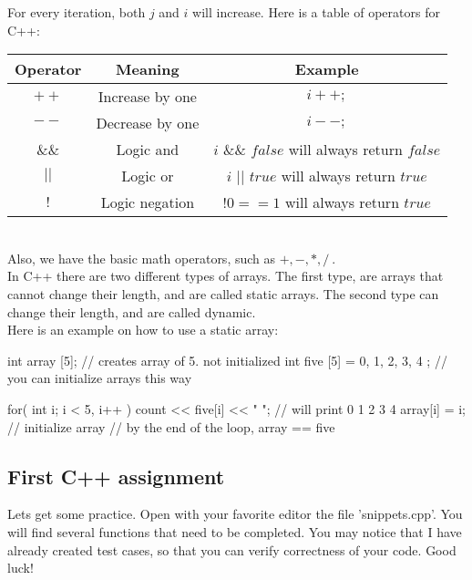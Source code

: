 \documentclass[../notebook.tex]{../subfiles/subfiles}
\begin{document}
For every iteration, both $j$ and $i$ will increase. Here is a table of operators for C++:\\
\begin{tabular}{|c | c | c |}
  \hline
  {\bf Operator} & {\bf Meaning} & {\bf Example} \\ 
  \hline
  $++$& Increase by one & $i++;$  \\
  \hline
  $--$& Decrease by one & $i--;$  \\
  \hline
  $\&\&$ & Logic and & $ i$ \&\& $false  $ will always return $false$ \\
  \hline
  $||$ & Logic or & $ i$ $||$ $true  $ will always return $true$ \\
  $!$ & Logic negation &  $!0 == 1  $ will always return $true$ \\
  \hline
\end{tabular}\\

Also, we have the basic math operators, such as $+,-,*,/\ $.\\
In C++ there are two different types of arrays. The first type, are arrays that cannot change their length, and are called static arrays. The second type can change their length, and are called dynamic.\\
Here is an example on how to use a static array:
\begin{cppcode}
  int array [5]; // creates array of 5. not initialized
  int five  [5] = { 0, 1, 2, 3, 4 }; // you can initialize arrays this way

  for( int i; i < 5, i++ )
  {
    count << five[i] << "  "; // will print 0 1 2 3 4
    array[i] = i; // initialize array
  }
  // by the end of the loop, array == five
\end{cppcode}
\subsection{First C++ assignment} %
\label{sub:First C++ assignment}
Lets get some practice. Open with your favorite editor the file 'snippets.cpp'. You will find several functions that need to be completed. You may notice that I have already created test cases, so that you can verify correctness of your code. Good luck!
\end{document}
